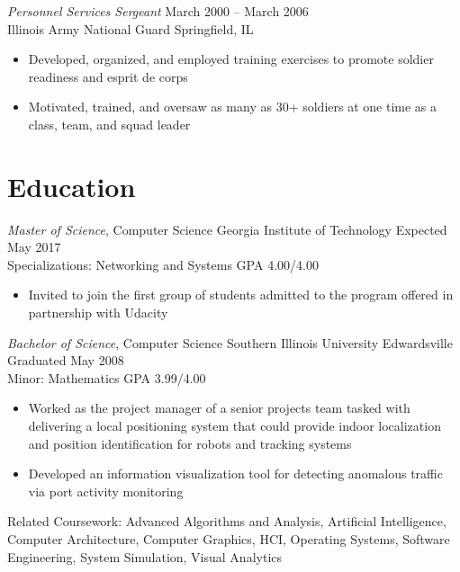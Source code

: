 \documentclass[margin,line]{resume}
\begin{document}
\begin{resume}
{\sl Personnel Services Sergeant}   \hfill   March 2000 -- March 2006\\
Illinois Army National Guard        \hfill   Springfield, IL
\begin{itemize} \itemsep -2pt %
\small\item Developed, organized, and employed training exercises to promote soldier readiness and esprit de corps
\small\item Motivated, trained, and oversaw as many as 30+ soldiers at one time as a class, team, and squad leader
\end{itemize}

\section{Education}
{\small
  {\sl Master of Science}, Computer Science \hfill
  Georgia Institute of Technology\hfill
  Expected May 2017\\
  Specializations: Networking and Systems \hfill
  GPA 4.00/4.00
}
\begin{itemize} \itemsep -2pt %
\small\item Invited to join the first group of students admitted to the program offered in partnership with Udacity
\end{itemize}

{\small
  {\sl Bachelor of Science}, Computer Science \hfill
  Southern Illinois University Edwardsville   \hfill
  Graduated May 2008\\
  Minor: Mathematics \hfill
  GPA 3.99/4.00
}
\begin{itemize} \itemsep -2pt %
\small\item Worked as the project manager of a senior projects team tasked with delivering a local positioning
            system that could provide indoor localization and position identification for robots and tracking systems
\small\item Developed an information visualization tool for detecting anomalous traffic via port activity monitoring
\end{itemize}

{\small
  Related Coursework: Advanced Algorithms and Analysis, Artificial Intelligence,
  Computer Architecture, Computer Graphics, HCI, Operating Systems, Software
  Engineering, System Simulation, Visual Analytics
}


\end{resume}
\end{document}
